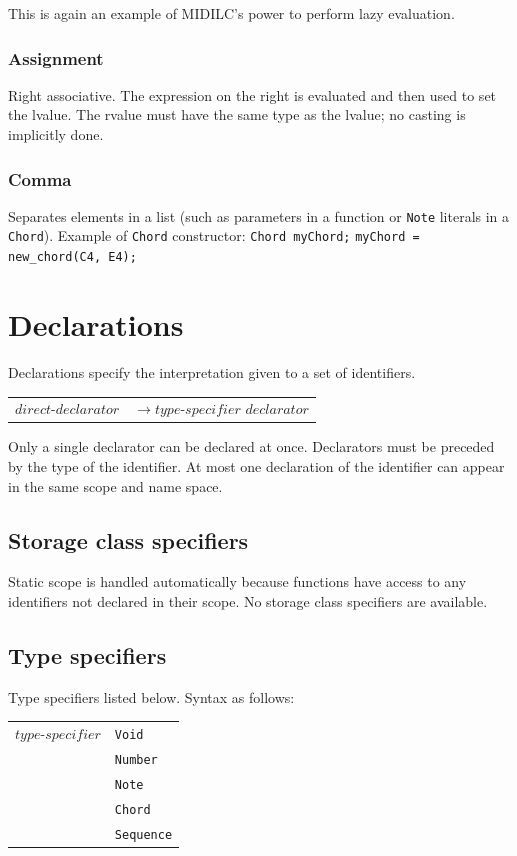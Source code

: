 \documentclass[12pt,A4]{book}
\begin{document}
This is again an example of MIDILC’s power to perform lazy evaluation.
\subsubsection{Assignment}
Right associative. The expression on the right is evaluated and then used to set the lvalue. The rvalue must have the same type as the lvalue; no casting is implicitly done.
\subsubsection{Comma}
Separates elements in a list (such as parameters in a function or \verb|Note| literals in a \verb|Chord|). Example of \verb|Chord| constructor:
\verb|Chord myChord;| \verb|myChord = new_chord(C4, E4);|
\section{Declarations}
Declarations specify the interpretation given to a set of identifiers.

\begin{tabular}{l l}
$direct\mbox{-}declarator$ & $\rightarrow type\mbox{-}specifier$ $declarator$
\end{tabular}

Only a single declarator can be declared at once.  Declarators must be preceded by the type of the identifier.  At most one declaration of the identifier can appear in the same scope and name space.  
\subsection{Storage class specifiers}
Static scope is handled automatically because functions have access to any identifiers not declared in their scope. No storage class specifiers are available.
\subsection{Type specifiers}
Type specifiers listed below.  Syntax as follows:

\begin{tabular}{l l}
$type\mbox{-}specifier$  & \verb|Void| \\
& \verb|Number|\\
& \verb|Note|\\
& \verb|Chord|\\
& \verb|Sequence|
\end{tabular}
\end{document}
